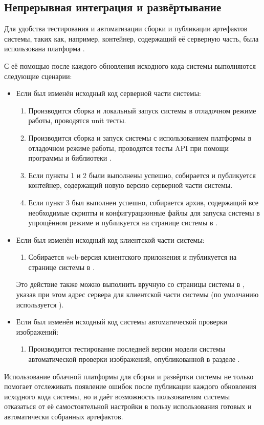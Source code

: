 \subsection{Непрерывная интеграция и развёртывание}

\tab
Для удобства тестирования и автоматизации сборки и публикации артефактов системы, таких как, например,  контейнер, содержащий её серверную часть, была использована платформа .

\tab
С её помощью после каждого обновления исходного кода системы выполняются следующие сценарии:
\begin{itemize}
	\item Если был изменён исходный код серверной части системы:
	\begin{enumerate}
		\item Производится сборка и локальный запуск системы в отладочном режиме работы, проводятся unit тесты.
		\item Производится сборка и запуск системы с использованием платформы  в отладочном режиме работы, проводятся тесты API при помощи программы  и библиотеки .
		\item Если пункты 1 и 2 были выполнены успешно, собирается и публикуется  контейнер, содержащий новую версию серверной части системы.
		\item Если пункт 3 был выполнен успешно, собирается архив, содержащий все необходимые скрипты и конфигурационные файлы для запуска системы в упрощённом режиме и публикуется на странице системы в \cite{https://github.com/pseusys/HogWeedGo}.
	\end{enumerate}
	\item Если был изменён исходный код клиентской части системы:
	\begin{enumerate}
		\item Собирается web-версия клиентского приложения и публикуется на странице системы в \cite{https://pseusys.github.io/HogWeedGo/}.
	\end{enumerate}
	Это действие также можно выполнить вручную со страницы системы в , указав при этом адрес сервера для клиентской части системы (по умолчанию используется ).
	\item Если был изменён исходный код системы автоматической проверки изображений:
	\begin{enumerate}
		\item Производится тестирование последней версии модели системы автоматической проверки изображений, опубликованной в разделе .
	\end{enumerate}
\end{itemize}

\tab
Использование облачной платформы для сборки и развёртки системы не только помогает отслеживать появление ошибок после публикации каждого обновления исходного кода системы, но и даёт возможность пользователям системы отказаться от её самостоятельной настройки в пользу использования готовых и автоматически собранных артефактов.
